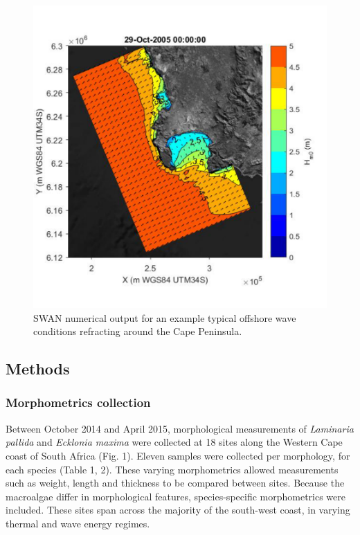 \documentclass[10pt,a4,]{article}
\makeatletter
\def\maxwidth{\ifdim\Gin@nat@width>\linewidth\linewidth
\else\Gin@nat@width\fi}
\let\Oldincludegraphics\includegraphics
\renewcommand{\includegraphics}[1]{\Oldincludegraphics[width=\maxwidth]{#1}}
\makeatother
\begin{document}
\begin{figure}
\centering
\includegraphics{chapter_2_files/figure-latex/unnamed-chunk-4-1.pdf}
\caption{SWAN numerical output for an example typical offshore wave
conditions refracting around the Cape Peninsula.}
\end{figure}

\newpage

\hypertarget{methods}{%
\subsection{Methods}\label{methods}}

\hypertarget{morphometrics-collection}{%
\subsubsection{Morphometrics
collection}\label{morphometrics-collection}}

Between October 2014 and April 2015, morphological measurements of
\emph{Laminaria pallida} and \emph{Ecklonia maxima} were collected at 18
sites along the Western Cape coast of South Africa (Fig. 1). Eleven
samples were collected per morphology, for each species (Table 1, 2).
These varying morphometrics allowed measurements such as weight, length
and thickness to be compared between sites. Because the macroalgae
differ in morphological features, species-specific morphometrics were
included. These sites span across the majority of the south-west coast,
in varying thermal and wave energy regimes.
\end{document}
